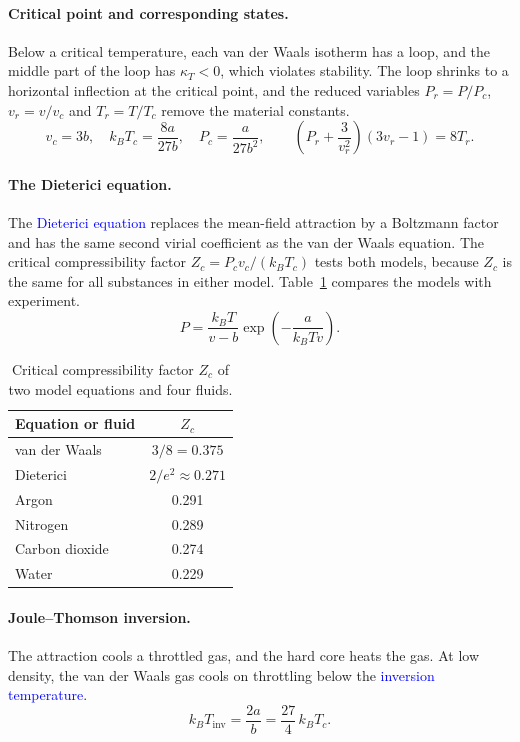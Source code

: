 \paragraph{Critical point and corresponding states.}
Below a critical temperature, each van der Waals isotherm has a loop, and
the middle part of the loop has $\kappa_T<0$, which violates stability. The loop shrinks to a horizontal
inflection at the critical point, and the reduced variables
$P_r=P/P_c$, $v_r=v/v_c$ and $T_r=T/T_c$ remove the material constants.
\begin{equation}
    \boxed{v_c=3b,\quad k_BT_c=\frac{8a}{27b},\quad P_c=\frac{a}{27b^2},
    \qquad
    \left(P_r+\frac{3}{v_r^2}\right)\left(3v_r-1\right)=8T_r.}
\end{equation}

\paragraph{The Dieterici equation.}
The \textcolor{blue}{Dieterici equation} replaces the mean-field attraction
by a Boltzmann factor and has the same second virial coefficient as the
van der Waals equation. The critical compressibility factor
$Z_c=P_cv_c/(k_BT_c)$ tests both models, because $Z_c$ is the same for all
substances in either model. Table~\ref{tab:Zc} compares the models with
experiment.
\begin{equation}
    \boxed{P=\frac{k_BT}{v-b}\exp\!\left(-\frac{a}{k_BTv}\right).}
\end{equation}
\begin{table}[h]
\centering
\caption{Critical compressibility factor $Z_c$ of two model equations and
four fluids.}
\label{tab:Zc}
\begin{tabular}{lc}
    Equation or fluid & $Z_c$ \\ \hline
    van der Waals & $3/8=0.375$ \\
    Dieterici & $2/e^2\approx0.271$ \\
    Argon & 0.291 \\
    Nitrogen & 0.289 \\
    Carbon dioxide & 0.274 \\
    Water & 0.229 \\
\end{tabular}
\end{table}

\paragraph{Joule--Thomson inversion.}
The attraction cools a throttled gas, and the hard core heats the gas. At
low density, the van der Waals gas cools on throttling below the
\textcolor{blue}{inversion temperature}.
\begin{equation}
    \boxed{k_BT_{\text{inv}}=\frac{2a}{b}=\frac{27}{4}\,k_BT_c.}
\end{equation}
